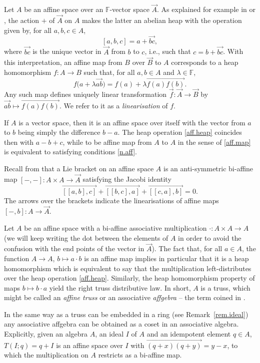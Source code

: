 \documentclass[10pt,a4paper]{amsart}
\numberwithin{equation}{section}
\newcommand{\F}{\mathbb F}
\begin{document}
Let $A$ be an affine space over an $\F$-vector space $\vec{A}$. As explained for example in \cite[Section~4]{BreBrz:hea} or \cite{Brz:Lie},
the action $+$ of $\vec{A}$ on $A$ makes the latter an abelian heap with the operation given by, for all $a,b,c \in A$,
\begin{equation}\label{aff.heap}
 [a,b,c] = a + \overrightarrow{bc},
\end{equation}
where $\overrightarrow{bc}$ is the unique vector in $\vec{A}$ from $b$ to $c$, i.e., such that $c = b+ \overrightarrow{bc}$.
With this interpretation, an affine map from $B$ over $\vec{B}$ to $A$ corresponds to a heap homomorphism $f\colon A\to B$ such that, for all $a,b\in A$ and $\lambda \in \F$,
\begin{equation}\label{aff.map}
 f\big(a + \lambda \overrightarrow{ab}\big) = f(a) + \lambda \overrightarrow{f(a)f(b)}.
\end{equation}
Any such map defines uniquely linear transformation $\vec{f}\colon \vec{A} \to \vec{B}$ by $\overrightarrow{ab}\mapsto \overrightarrow{f(a)f(b)}$. We refer to it as a \textit{linearisation} of $f$.

If $A$ is a vector space, then it is an affine space over itself with the vector from $a$ to $b$ being simply the difference $b-a$. The heap operation \eqref{aff.heap} coincides then with $a-b+c$, while to be affine map from $A$ to $A$ in the sense of \eqref{aff.map} is equivalent to satisfying conditions \eqref{n.aff}.

Recall from \cite[Definition~1]{GraGra:Lie} that a Lie bracket on an affine space $A$ is an anti-symmetric bi-affine map $[-,-]\colon A\times A\to \vec{A}$ satisfying the Jacobi identity
\[
\overrightarrow{[[a,b],c]} + \overrightarrow{[[b,c],a]} +\overrightarrow{[[c,a],b]} =0.
\]
The arrows over the brackets indicate the linearisations of affine maps $[-,b]\colon A\to \vec{A}$.

Let $A$ be an affine space with a bi-affine associative multiplication $\cdot\colon A\times A \to A$ (we will keep writing the dot between the elements of $A$ in order to avoid the confusion with the end points of the vector in $\vec{A}$). The fact that, for all $a\in A$, the function $A\to A$, $b\mapsto a\cdot b$ is an affine map implies in particular that it is a heap homomorphism which is equivalent to say that the multiplication left-distributes over the heap operation \eqref{aff.heap}. Similarly, the heap homomorphism property of maps $b\mapsto b\cdot a$ yield the right truss distributive law. In short, $A$ is a truss, which might be called an \textit{affine truss} or an associative \textit{affgebra} -- the term coined in \cite{GraGra:Lie}.
\begin{Remark}\label{rem.ideal.aff}
In the same way as a truss can be embedded in a ring (see Remark~\ref{rem.ideal}) any associative affgebra can be obtained as a coset in an associative algebra. Explicitly, given an algebra $A$, an ideal $I$ of $A$ and an idempotent element $q\in A$, $T(I;q) = q+I$ is an affine space over $I$ with $\overrightarrow{(q +x)(q+y)}= y-x$, to which the multiplication on $A$ restricts as a bi-affine map.
\end{Remark}
\end{document}

